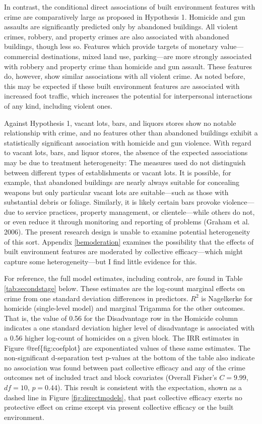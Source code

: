 \documentclass [11pt, proquest] {uwthesis}[2015/03/03]
\begin{document}
In contrast, the conditional direct associations of built environment features with crime are comparatively large as proposed in Hypothesis 1. Homicide and gun assaults are significantly predicted only by abandoned buildings. All violent crimes, robbery, and property crimes are also associated with abandoned buildings, though less so. Features which provide targets of monetary value---commercial destinations, mixed land use, parking---are more strongly associated with robbery and property crime than homicide and gun assault. These features do, however, show similar associations with all violent crime. As noted before, this may be expected if these built environment features are associated with increased foot traffic, which increases the potential for interpersonal interactions of any kind, including violent ones.

Against Hypothesis 1, vacant lots, bars, and liquors stores show no notable relationship with crime, and no features other than abandoned buildings exhibit a statistically significant association with homicide and gun violence. With regard to vacant lots, bars, and liquor stores, the absence of the expected associations may be due to treatment heterogeneity: The measures used do not distinguish between different types of establishments or vacant lots. It is possible, for example, that abandoned buildings are nearly always suitable for concealing weapons but only particular vacant lots are suitable---such as those with substantial debris or foliage. Similarly, it is likely certain bars provoke violence---due to service practices, property management, or clientele---while others do not, or even reduce it through monitoring and reporting of problems (Graham et al. 2006). The present research design is unable to examine potential heterogeneity of this sort. Appendix \ref{bemoderation} examines the possibility that the effects of built environment features are moderated by collective efficacy---which might capture some heterogeneity---but I find little evidence for this.

For reference, the full model estimates, including controls, are found in Table \ref{tab:secondstage} below. These estimates are the log-count marginal effects on crime from one standard deviation differences in predictors. \(R^{2}\) is Nagelkerke for homicide (single-level model) and marginal Trigamma for the other outcomes. That is, the value of 0.56 for the Disadvantage row in the Homicide column indicates a one standard deviation higher level of disadvantage is associated with a 0.56 higher log-count of homicides on a given block. The IRR estimates in Figure @ref\{fig:coefplot\} are exponentiated values of these same estimates. The non-significant d-separation test p-values at the bottom of the table also indicate no association was found between past collective efficacy and any of the crime outcomes net of included tract and block covariates (Overall Fisher's \(C = 9.99\), \(df = 10\), \(p = 0.44\)). This result is consistent with the expectation, shown as a dashed line in Figure \ref{fig:directmodels}, that past collective efficacy exerts no protective effect on crime except via present collective efficacy or the built environment.
\end{document}
